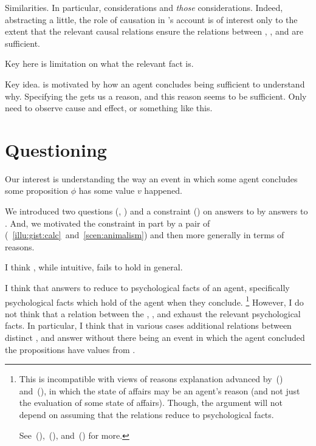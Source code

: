 \begin{note}
  Similarities.
  In particular, considerations and \emph{those} considerations.
  Indeed, abstracting a little, the role of causation in \citeauthor{Davidson:1963aa}'s account is of interest only to the extent that the relevant causal relations ensure the relations between , , and  are sufficient.

  Key here is limitation on what the relevant fact is.
\end{note}

\begin{note}
  Key idea.
  \issueInclusion{} is motivated by how an agent concludes being sufficient to understand why.
  Specifying the \pool{} gets us a reason, and this reason seems to be sufficient.
  Only need to observe cause and effect, or something like this.
\end{note}


\section*{Questioning \issueInclusion{}}

\begin{note}
  Our interest is understanding the way an event in which some agent \vAgent{} concludes some proposition \(\phi\) has some value \(v\) happened.

  We introduced two questions (\qWhy{}, \qHow{}) and a constraint (\issueInclusion{}) on answers to \qWhy{} by answers to \qHow{}.
  And, we motivated the constraint in part by a pair of  (~\ref{illu:gist:calc}~and~\ref{scen:animalism}) and then more generally in terms of reasons.

  I think \issueInclusion{}, while intuitive, fails to hold in general.
\end{note}

\begin{note}
  I think that answers to \qWhy{} reduce to psychological facts of an agent, specifically psychological facts which hold of the agent when they conclude.%
  \footnote{
    This is incompatible with views of reasons explanation advanced by~(\cite{Dancy:2000aa}) and~(\cite{Alvarez:2013aa}), in which the state of affairs may be an agent's reason (and not just the evaluation of some state of affairs).
    Though, the argument will not depend on assuming that the relations reduce to psychological facts.

    See~(\cite[413--418]{Hieronymi:2011aa}),~(\cite[3--5]{DOro:2013vh}), and~(\cite[\S2]{Alvarez:2017aa}) for more.
  }
  However, I do not think that a relation between the , , and \pool{} exhaust the relevant psychological facts.
  In particular, I think that in various cases additional relations between distinct ,  and  answer \qWhy{} without there being an event in which the agent concluded the propositions have values from .
\end{note}

